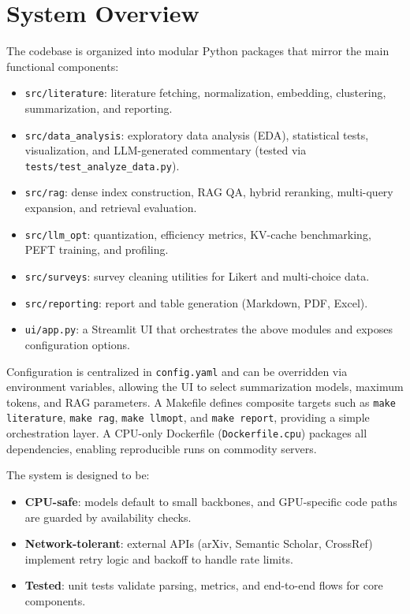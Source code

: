 \documentclass[11pt]{article}
\begin{document}
\section{System Overview}

The codebase is organized into modular Python packages that mirror the main functional components:

\begin{itemize}[leftmargin=1.5em]
\item \verb|src/literature|: literature fetching, normalization, embedding, clustering, summarization, and reporting.
\item \verb|src/data_analysis|: exploratory data analysis (EDA), statistical tests, visualization, and LLM-generated commentary (tested via \verb|tests/test_analyze_data.py|).
\item \verb|src/rag|: dense index construction, RAG QA, hybrid reranking, multi-query expansion, and retrieval evaluation.
\item \verb|src/llm_opt|: quantization, efficiency metrics, KV-cache benchmarking, PEFT training, and profiling.
\item \verb|src/surveys|: survey cleaning utilities for Likert and multi-choice data.
\item \verb|src/reporting|: report and table generation (Markdown, PDF, Excel).
\item \verb|ui/app.py|: a Streamlit UI that orchestrates the above modules and exposes configuration options.
\end{itemize}

Configuration is centralized in \verb|config.yaml| and can be overridden via environment variables, allowing the UI to select summarization models, maximum tokens, and RAG parameters. A Makefile defines composite targets such as \verb|make literature|, \verb|make rag|, \verb|make llmopt|, and \verb|make report|, providing a simple orchestration layer. A CPU-only Dockerfile (\verb|Dockerfile.cpu|) packages all dependencies, enabling reproducible runs on commodity servers.

The system is designed to be:

\begin{itemize}[leftmargin=1.5em]
\item \textbf{CPU-safe}: models default to small backbones, and GPU-specific code paths are guarded by availability checks.
\item \textbf{Network-tolerant}: external APIs (arXiv, Semantic Scholar, CrossRef) implement retry logic and backoff to handle rate limits.
\item \textbf{Tested}: unit tests validate parsing, metrics, and end-to-end flows for core components.
\end{itemize}
\end{document}

